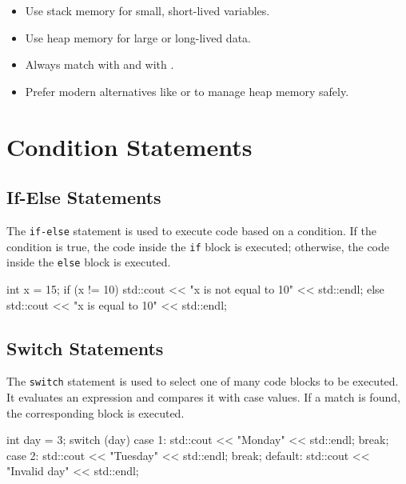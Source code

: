 \begin{tipsblock}
    \begin{itemize}
        \item Use stack memory for small, short-lived variables.
        \item Use heap memory for large or long-lived data.
        \item Always match  with  and  with .
        \item Prefer modern alternatives like  or  to manage heap memory safely.
    \end{itemize}
\end{tipsblock}

\section{Condition Statements}

\subsection{If-Else Statements}

The \texttt{if-else} statement is used to execute code based on a condition. If the condition is true, the code inside the \texttt{if} block is executed; otherwise, the code inside the \texttt{else} block is executed.

\begin{exampleblock}
    \begin{codeblock}[language=C++]
int x = 15;
if (x != 10) {
    std::cout << "x is not equal to 10" << std::endl;
} else {
    std::cout << "x is equal to 10" << std::endl;
}
    \end{codeblock}
\end{exampleblock}

\subsection{Switch Statements}

The \texttt{switch} statement is used to select one of many code blocks to be executed. It evaluates an expression and compares it with case values. If a match is found, the corresponding block is executed.

\begin{exampleblock}
    \begin{codeblock}[language=C++]
int day = 3;
switch (day) {
    case 1:
        std::cout << "Monday" << std::endl;
        break;
    case 2:
        std::cout << "Tuesday" << std::endl;
        break;
    default:
        std::cout << "Invalid day" << std::endl;
}
    \end{codeblock}
\end{exampleblock}

